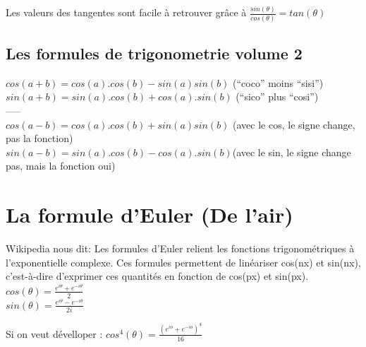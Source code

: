 \documentclass[10pt,a4paper]{article}
\begin{document}
 
 \begin{center}
 \end{center}
 
 
 Les valeurs des tangentes sont facile à retrouver grâce à $\frac{sin(\theta)}{cos(\theta)}=tan(\theta)$
 \subsection{Les formules de trigonometrie volume 2}
 $cos(a+b)=cos(a).cos(b)-sin(a)sin(b)$ (``coco''  moins ``sisi'')\\
 $sin(a+b)= sin(a).cos(b) + cos(a).sin(b)$ (``sico'' plus ``cosi'')\\
 -----\\
$cos(a-b)=cos(a).cos(b) + sin(a)sin(b)$ (avec le cos, le signe change, pas la fonction)\\
$sin(a-b)= sin(a).cos(b) - cos(a).sin(b)$(avec le sin, le signe change pas, mais la fonction oui) \\
 \section{La formule d'Euler (De l'air)}
 Wikipedia nous dit:  Les formules d'Euler relient les fonctions trigonométriques à l'exponentielle complexe. Ces formules permettent de linéariser cos(nx) et sin(nx), c'est-à-dire d'exprimer ces quantités en fonction de cos(px) et sin(px).\\
$cos(\theta)=\frac{e^{i\theta}+e^{-i\theta}}{2}$\\
$sin(\theta)=\frac{e^{i\theta}-e^{-i\theta}}{2i}$
 
 Si on veut dévelloper : $cos^4(\theta)=\frac{(e^{io}+e^{-io})^4}{16}$
\end{document}
